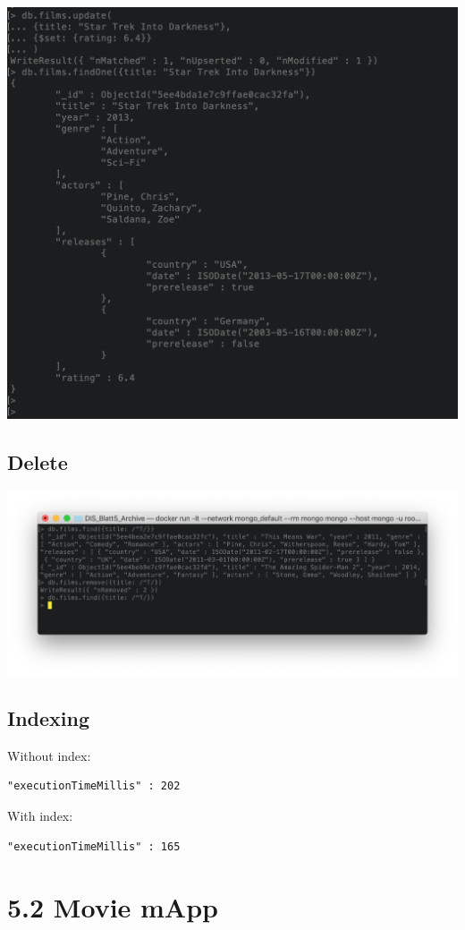 \documentclass[ngerman]{dis-template-add}
\begin{document}
\includegraphics[scale=0.3]{update.png}

\subsection*{Delete}

\includegraphics[scale=0.3]{delete.png}

\subsection*{Indexing}

Without index: 
\begin{verbatim}
"executionTimeMillis" : 202
\end{verbatim}

With index:
\begin{verbatim}
"executionTimeMillis" : 165
\end{verbatim}



\section*{5.2 Movie mApp}
\end{document}
